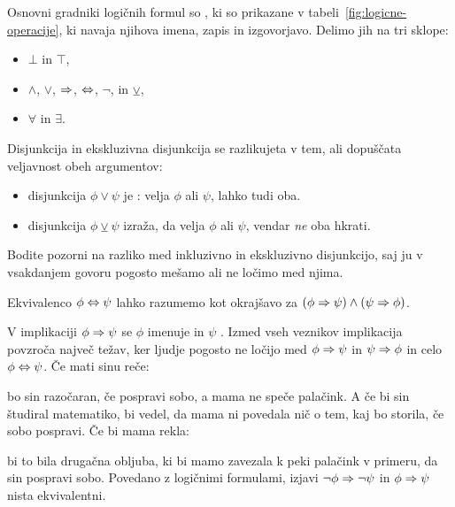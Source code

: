 Osnovni gradniki logičnih formul so , ki so prikazane v tabeli~\ref{fig:logicne-operacije},
ki navaja njihova imena, zapis in izgovorjavo.
%
Delimo jih na tri sklope:
%
\begin{itemize}
\item {} $\bot$ in $\top$,
\item {} $\land$, $\lor$, $\Rightarrow$, $\Leftrightarrow$, $\neg$, in $\veebar$,
\item {} $\forall$ in $\exists$.
\end{itemize}
%

Disjunkcija in ekskluzivna disjunkcija se razlikujeta v tem, ali dopuščata veljavnost obeh argumentov:
%
\begin{itemize}
\item disjunkcija $\phi \lor \psi$ je : velja $\phi$ ali $\psi$, lahko tudi oba.
\item {} disjunkcija $\phi \veebar \psi$ izraža, da velja $\phi$ ali $\psi$, vendar \emph{ne} oba hkrati.
\end{itemize}
%
Bodite pozorni na razliko med inkluzivno in ekskluzivno disjunkcijo, saj ju v vsakdanjem govoru pogosto mešamo ali ne ločimo med njima.

Ekvivalenco $\phi \Leftrightarrow \psi$ lahko razumemo kot okrajšavo za $(\phi \Rightarrow \psi) \land (\psi \Rightarrow \phi)$.

V implikaciji $\phi \Rightarrow \psi$ se $\phi$ imenuje  in $\psi$ . 
%
Izmed vseh veznikov implikacija povzroča največ težav, ker ljudje pogosto ne ločijo med $\phi \Rightarrow \psi$ in $\psi \Rightarrow \phi$ in celo $\phi \Leftrightarrow \psi$. Če mati sinu reče:
%
\begin{quote}
\end{quote}
%
bo sin razočaran, če pospravi sobo, a mama ne speče palačink. A če bi sin študiral matematiko, bi vedel, da mama ni povedala nič o tem, kaj bo storila, če sobo pospravi. Če bi mama rekla:
%
\begin{quote}
\end{quote}
%
bi to bila drugačna obljuba, ki bi mamo zavezala k peki palačink v primeru, da sin pospravi sobo.
Povedano z logičnimi formulami, izjavi $\neg \phi \Rightarrow \neg \psi$ in $\phi \Rightarrow \psi$ nista ekvivalentni.

